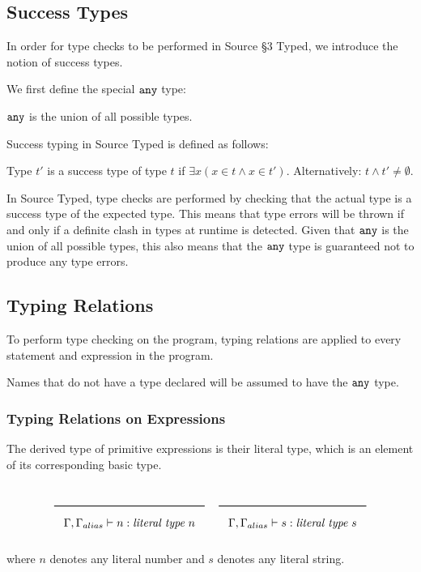 \subsection{Success Types}

In order for type checks to be performed in Source \S 3 Typed, we introduce the notion of success types.

We first define the special $\texttt{any}$ type:
\begin{definition}
$\texttt{any}$ is the union of all possible types.
\end{definition}

Success typing in Source Typed is defined as follows:

\begin{definition}
Type $t'$ is a success type of type $t$ if $\exists x (x \in t \wedge x \in t')$.
Alternatively: $t \wedge t' \neq \emptyset$.
\end{definition}

In Source Typed, type checks are performed by checking that the actual type is a success type of the expected type.
This means that type errors will be thrown if and only if a definite clash in types at runtime is detected.
Given that $\texttt{any}$ is the union of all possible types, this also means that the $\texttt{any}$ type is guaranteed not to produce any type errors.

\subsection{Typing Relations}
\label{typing-rules}

To perform type checking on the program, typing relations are applied to every statement and expression in the program.

Names that do not have a type declared will be assumed to have the $\texttt{any}$ type.

\subsubsection{Typing Relations on Expressions}

The derived type of primitive expressions is their literal type, which is an element of its corresponding basic type.

\noindent
\[
  \Rule{}{\Gamma, \Gamma_{alias} \vdash n : \textit{literal type}\ n}
  \quad
  \Rule{}{\Gamma, \Gamma_{alias} \vdash s : \textit{literal type}\ s}
\]
\noindent

where $n$ denotes any literal number and $s$ denotes any literal string.

